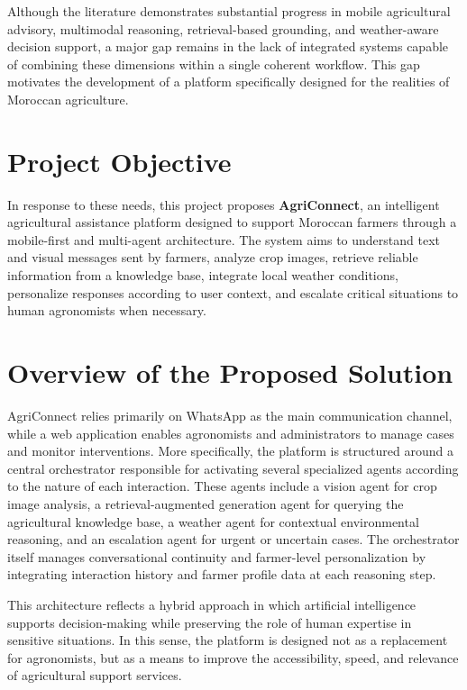 Although the literature demonstrates substantial progress in mobile agricultural advisory, multimodal reasoning, retrieval-based grounding, and weather-aware decision support, a major gap remains in the lack of integrated systems capable of combining these dimensions within a single coherent workflow. This gap motivates the development of a platform specifically designed for the realities of Moroccan agriculture.

\section{Project Objective}

In response to these needs, this project proposes \textbf{AgriConnect}, an intelligent agricultural assistance platform designed to support Moroccan farmers through a mobile-first and multi-agent architecture. The system aims to understand text and visual messages sent by farmers, analyze crop images, retrieve reliable information from a knowledge base, integrate local weather conditions, personalize responses according to user context, and escalate critical situations to human agronomists when necessary.

\section{Overview of the Proposed Solution}

AgriConnect relies primarily on WhatsApp as the main communication channel, while a web application enables agronomists and administrators to manage cases and monitor interventions. More specifically, the platform is structured around a central orchestrator responsible for activating several specialized agents according to the nature of each interaction. These agents include a vision agent for crop image analysis, a retrieval-augmented generation agent for querying the agricultural knowledge base, a weather agent for contextual environmental reasoning, and an escalation agent for urgent or uncertain cases. The orchestrator itself manages conversational continuity and farmer-level personalization by integrating interaction history and farmer profile data at each reasoning step.

This architecture reflects a hybrid approach in which artificial intelligence supports decision-making while preserving the role of human expertise in sensitive situations. In this sense, the platform is designed not as a replacement for agronomists, but as a means to improve the accessibility, speed, and relevance of agricultural support services.

